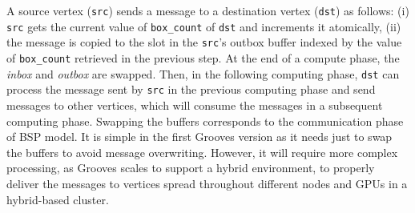A source vertex (\texttt{src}) sends a message to a destination vertex (\texttt{dst}) as follows: (i) \texttt{src} gets the current value of \texttt{box_count} of \texttt{dst} and increments it atomically, (ii) the message is copied to the slot in the \texttt{src}’s outbox buffer indexed by the value of \texttt{box_count} retrieved in the previous step. At the end of a compute phase, the \emph{inbox} and \emph{outbox} are swapped. Then, in the following computing phase, \texttt{dst} can process the message sent by \texttt{src} in the previous computing phase and send messages to other vertices, which will consume the messages in a subsequent computing phase. Swapping the buffers corresponds to the communication phase of BSP model. It is simple in the first Grooves version as it needs just to swap the buffers to avoid message overwriting. However, it will require more complex processing, as Grooves scales to support a hybrid environment, to properly deliver the messages to vertices spread throughout different nodes and GPUs in a hybrid-based cluster. 
